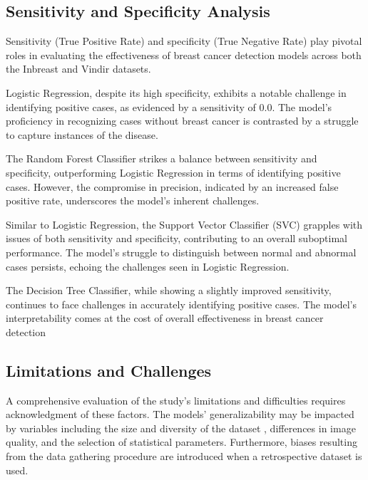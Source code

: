 \subsection{Sensitivity and Specificity Analysis}
Sensitivity (True Positive Rate) and specificity (True Negative Rate) play pivotal roles in evaluating the effectiveness of breast cancer detection models \cite{ohuchi2016sensitivity} across both the Inbreast and Vindir datasets.

Logistic Regression, despite its high specificity, exhibits a notable challenge in identifying positive cases, as evidenced by a sensitivity of 0.0. The model's proficiency in recognizing cases without breast cancer is contrasted by a struggle to capture instances of the disease.

The Random Forest Classifier strikes a balance between sensitivity and specificity, outperforming Logistic Regression in terms of identifying positive cases. However, the compromise in precision, indicated by an increased false positive rate, underscores the model's inherent challenges.

Similar to Logistic Regression, the Support Vector Classifier (SVC) grapples with issues of both sensitivity and specificity, contributing to an overall suboptimal performance. The model's struggle to distinguish between normal and abnormal cases persists, echoing the challenges seen in Logistic Regression.

The Decision Tree Classifier, while showing a slightly improved sensitivity, continues to face challenges in accurately identifying positive cases. The model's interpretability comes at the cost of overall effectiveness in breast cancer detection

\subsection{Limitations and Challenges}
A comprehensive evaluation of the study's limitations and difficulties requires acknowledgment of these factors. The models' generalizability may be impacted by variables including the size and diversity of the dataset \cite{forde2008understanding}, differences in image quality, and the selection of statistical parameters. Furthermore, biases resulting from the data gathering procedure are introduced when a retrospective dataset is used.